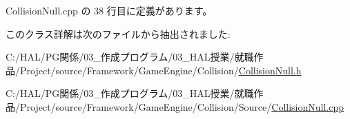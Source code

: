  Collision\+Null.\+cpp の 38 行目に定義があります。



このクラス詳解は次のファイルから抽出されました\+:\begin{DoxyCompactItemize}
\item 
C\+:/\+H\+A\+L/\+P\+G関係/03\+\_\+作成プログラム/03\+\_\+\+H\+A\+L授業/就職作品/\+Project/source/\+Framework/\+Game\+Engine/\+Collision/\mbox{\hyperlink{_collision_null_8h}{Collision\+Null.\+h}}\item 
C\+:/\+H\+A\+L/\+P\+G関係/03\+\_\+作成プログラム/03\+\_\+\+H\+A\+L授業/就職作品/\+Project/source/\+Framework/\+Game\+Engine/\+Collision/\+Source/\mbox{\hyperlink{_collision_null_8cpp}{Collision\+Null.\+cpp}}\end{DoxyCompactItemize}
